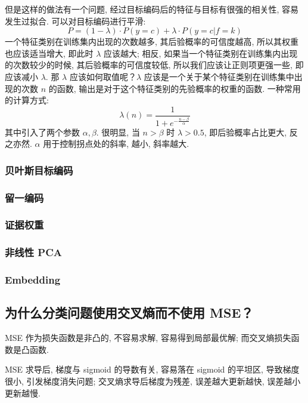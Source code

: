 但是这样的做法有一个问题, 经过目标编码后的特征与目标有很强的相关性, 容易发生过拟合. 可以对目标编码进行平滑: 
$$
P = (1-\lambda) \cdot P(y = c) + \lambda \cdot P(y=c | f=k)
$$
一个特征类别在训练集内出现的次数越多, 其后验概率的可信度越高, 所以其权重也应该适当增大, 即此时 $\lambda$ 应该越大; 相反, 如果当一个特征类别在训练集内出现的次数较少的时候, 其后验概率的可信度较低, 所以我们应该让正则项更强一些, 即应该减小 $\lambda$. 那 $\lambda$ 应该如何取值呢？$\lambda$ 应该是一个关于某个特征类别在训练集中出现的次数 $n$ 的函数, 输出是对于这个特征类别的先验概率的权重的函数. 一种常用的计算方式: 
$$
\lambda (n) = \frac{1}{1+e^{-\frac{n-\beta}{\alpha}}}
$$
其中引入了两个参数 $\alpha, \beta$. 很明显, 当 $n > \beta$ 时 $\lambda > 0.5$, 即后验概率占比更大, 反之亦然. $\alpha$ 用于控制拐点处的斜率, 越小, 斜率越大.  

\subsubsection{贝叶斯目标编码}

\subsubsection{留一编码}

\subsubsection{证据权重}

\subsubsection{非线性 PCA}

\subsubsection{Embedding}

\subsection{为什么分类问题使用交叉熵而不使用 MSE？}
MSE 作为损失函数是非凸的, 不容易求解, 容易得到局部最优解; 而交叉熵损失函数是凸函数. 

MSE 求导后, 梯度与 sigmoid 的导数有关, 容易落在 sigmoid 的平坦区, 导致梯度很小, 引发梯度消失问题; 交叉熵求导后梯度为残差, 误差越大更新越快, 误差越小更新越慢. 

